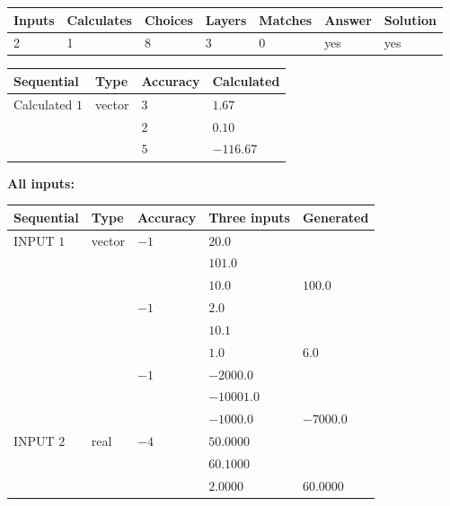 \documentclass[12pt]{article}
\begin{document}
   
   
   
\noindent\begin{tabular}{|l|l|l|l|l|l|l|}
 \hline
Inputs & Calculates & Choices & Layers & Matches & Answer & Solution \\ \hline
           2  & 
           1  & 
           8
  & 
           3  & 
           0  & 
  yes & 
  yes 
  \\ \hline
 \end{tabular}
   
   
   
   
\noindent{}
   
   
  
  
\noindent\begin{tabular}{|l|l|l|l|}
\hline
 Sequential & Type & Accuracy & Calculated \\ 
\hline
 
 
  Calculated $            1 $ & vector &  
  $            3  $ 
 &  $ 1.67 $ 
 \\    
  & & 
  $            2  $ 
 &  $ 0.10 $ 
 \\    
  & & 
  $            5  $ 
 &  $ -116.67 $ 
 \\  \hline  
 \end{tabular}
   
   
   
   
\noindent\vspace{0.1in}\hspace{-0.08in} {\textbf{\Large{All inputs: }}}
   
   
  
  
\noindent\begin{tabular}{|l|l|l|l|l|}
\hline
 Sequential & Type & Accuracy & Three inputs & Generated \\ 
\hline
 
 
  INPUT $            1 $ & vector & $           -1  $ & $
20.0
  $ & \\
  & & & $
101.0
  $ & \\
  & & & $
10.0
$ & $ 100.0 $ 
  \\
  & & $           -1  $ & $
2.0
  $ & \\
  & & & $
10.1
  $ & \\
  & & & $
1.0
$ & $ 6.0 $ 
  \\
  & & $           -1  $ & $
-2000.0
  $ & \\
  & & & $
-10001.0
  $ & \\
  & & & $
-1000.0
$ & $ -7000.0 $ 
 \\  \hline  
 
 
  INPUT $            2 $ & real & $           -4  $ & $
 50.0000
  $ & \\
  & & &  $
 60.1000
  $ & \\
  & & &  $
 2.0000
 $ & $ 60.0000 $ 
 \\  \hline  
 \end{tabular}
   
\end{document}
